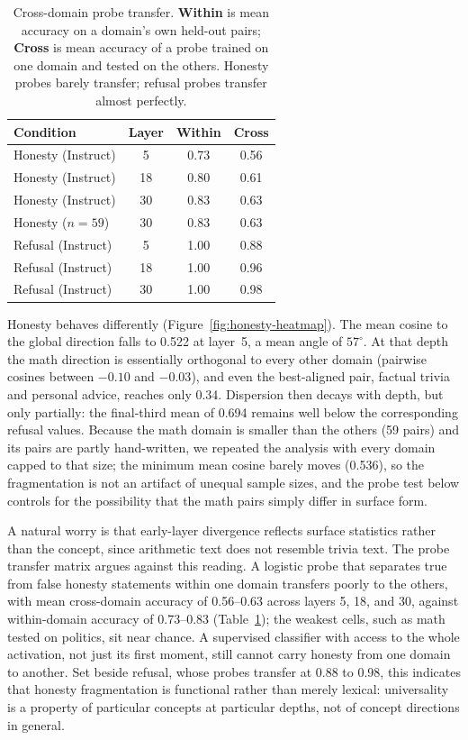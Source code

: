 \documentclass[11pt]{article}
\begin{document}
\begin{table}[t]
  \centering
  \small
  \begin{tabular}{lccc}
    \toprule
    \textbf{Condition} & \textbf{Layer} & \textbf{Within} & \textbf{Cross} \\
    \midrule
    Honesty (Instruct) & 5  & 0.73 & 0.56 \\
    Honesty (Instruct) & 18 & 0.80 & 0.61 \\
    Honesty (Instruct) & 30 & 0.83 & 0.63 \\
    Honesty ($n{=}59$) & 30 & 0.83 & 0.63 \\
    \midrule
    Refusal (Instruct) & 5  & 1.00 & 0.88 \\
    Refusal (Instruct) & 18 & 1.00 & 0.96 \\
    Refusal (Instruct) & 30 & 1.00 & 0.98 \\
    \bottomrule
  \end{tabular}
  \caption{Cross-domain probe transfer. \textbf{Within} is mean accuracy on
  a domain's own held-out pairs; \textbf{Cross} is mean accuracy of a probe
  trained on one domain and tested on the others. Honesty probes barely
  transfer; refusal probes transfer almost perfectly.}
  \label{tab:probe}
\end{table}

Honesty behaves differently (Figure~\ref{fig:honesty-heatmap}). The mean
cosine to the global direction falls to 0.522 at layer~5, a mean angle of
$57^\circ$. At that depth the math direction is essentially orthogonal to
every other domain (pairwise cosines between $-0.10$ and $-0.03$), and even
the best-aligned pair, factual trivia and personal advice, reaches only
0.34. Dispersion then decays with depth, but only
partially: the final-third mean of 0.694 remains well below the
corresponding refusal values. Because the math domain is smaller than the
others (59 pairs) and its pairs are partly hand-written, we repeated the
analysis with every domain capped to that size; the minimum mean cosine
barely moves (0.536), so the fragmentation is not an artifact of unequal
sample sizes, and the probe test below controls for the possibility that the
math pairs simply differ in surface form.

A natural worry is that early-layer divergence reflects surface statistics
rather than the concept, since arithmetic text does not resemble trivia
text. The probe transfer matrix argues against this reading. A logistic
probe that separates true from false honesty statements within one domain
transfers poorly to the others, with mean cross-domain accuracy of
0.56--0.63 across layers 5, 18, and 30, against within-domain accuracy of
0.73--0.83 (Table~\ref{tab:probe}); the weakest cells, such as math tested on
politics, sit near chance. A supervised classifier with access to the whole
activation, not just its first moment, still cannot carry honesty from one
domain to another. Set beside refusal, whose probes transfer at 0.88 to 0.98,
this indicates that honesty fragmentation is functional rather than merely
lexical: universality is a property of particular concepts at particular
depths, not of concept directions in general.
\end{document}
